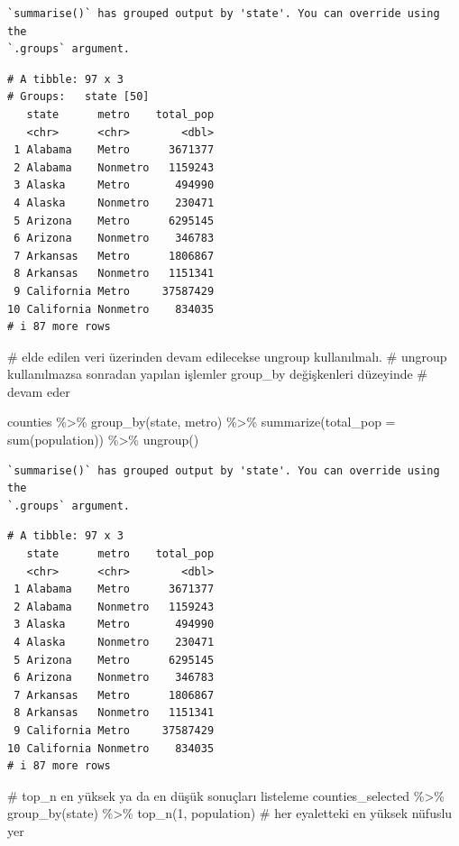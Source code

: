\documentclass[
  letterpaper,
  DIV=11,
  numbers=noendperiod]{scrreprt}
\newenvironment{Shaded}{\begin{snugshade}}{\end{snugshade}}
\newcommand{\AttributeTok}[1]{\textcolor[rgb]{0.40,0.45,0.13}{#1}}
\newcommand{\CommentTok}[1]{\textcolor[rgb]{0.37,0.37,0.37}{#1}}
\newcommand{\DecValTok}[1]{\textcolor[rgb]{0.68,0.00,0.00}{#1}}
\newcommand{\FunctionTok}[1]{\textcolor[rgb]{0.28,0.35,0.67}{#1}}
\newcommand{\NormalTok}[1]{\textcolor[rgb]{0.00,0.23,0.31}{#1}}
\newcommand{\SpecialCharTok}[1]{\textcolor[rgb]{0.37,0.37,0.37}{#1}}
\begin{document}
\begin{verbatim}
`summarise()` has grouped output by 'state'. You can override using the
`.groups` argument.
\end{verbatim}

\begin{verbatim}
# A tibble: 97 x 3
# Groups:   state [50]
   state      metro    total_pop
   <chr>      <chr>        <dbl>
 1 Alabama    Metro      3671377
 2 Alabama    Nonmetro   1159243
 3 Alaska     Metro       494990
 4 Alaska     Nonmetro    230471
 5 Arizona    Metro      6295145
 6 Arizona    Nonmetro    346783
 7 Arkansas   Metro      1806867
 8 Arkansas   Nonmetro   1151341
 9 California Metro     37587429
10 California Nonmetro    834035
# i 87 more rows
\end{verbatim}

\begin{Shaded}
\begin{Highlighting}[]
\CommentTok{\# elde edilen veri üzerinden devam edilecekse ungroup kullanılmalı.}
\CommentTok{\# ungroup kullanılmazsa sonradan yapılan işlemler group\_by değişkenleri düzeyinde}
\CommentTok{\# devam eder}

\NormalTok{counties }\SpecialCharTok{\%\textgreater{}\%}
\FunctionTok{group\_by}\NormalTok{(state, metro) }\SpecialCharTok{\%\textgreater{}\%}
\FunctionTok{summarize}\NormalTok{(}\AttributeTok{total\_pop =} \FunctionTok{sum}\NormalTok{(population)) }\SpecialCharTok{\%\textgreater{}\%}
\FunctionTok{ungroup}\NormalTok{()}
\end{Highlighting}
\end{Shaded}

\begin{verbatim}
`summarise()` has grouped output by 'state'. You can override using the
`.groups` argument.
\end{verbatim}

\begin{verbatim}
# A tibble: 97 x 3
   state      metro    total_pop
   <chr>      <chr>        <dbl>
 1 Alabama    Metro      3671377
 2 Alabama    Nonmetro   1159243
 3 Alaska     Metro       494990
 4 Alaska     Nonmetro    230471
 5 Arizona    Metro      6295145
 6 Arizona    Nonmetro    346783
 7 Arkansas   Metro      1806867
 8 Arkansas   Nonmetro   1151341
 9 California Metro     37587429
10 California Nonmetro    834035
# i 87 more rows
\end{verbatim}

\begin{Shaded}
\begin{Highlighting}[]
\CommentTok{\# top\_n en yüksek ya da en düşük sonuçları listeleme}
\NormalTok{counties\_selected }\SpecialCharTok{\%\textgreater{}\%}
\FunctionTok{group\_by}\NormalTok{(state) }\SpecialCharTok{\%\textgreater{}\%}
\FunctionTok{top\_n}\NormalTok{(}\DecValTok{1}\NormalTok{, population) }\CommentTok{\# her eyaletteki en yüksek nüfuslu yer}
\end{Highlighting}
\end{Shaded}
\end{document}
